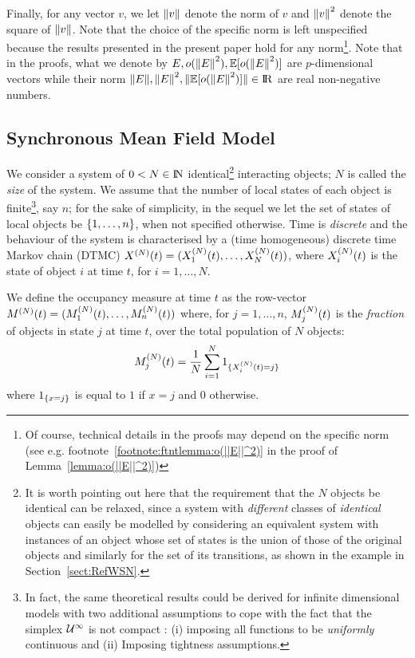 \documentclass[review]{elsarticle}
\begin{document}
Finally, for any vector $v$, we let $\norm{v}$ denote the norm of $v$
and $\norm{v}^2$ denote the square of $\norm{v}$. Note that the choice
of the specific norm is left unspecified because the results presented
in the present paper hold for any norm\footnote{Of course, technical
  details in the proofs may depend on the specific norm (see
  e.g. footnote~\ref{footnote:ftntlemma:o(||E||^2)} in the proof of
  Lemma~\ref{lemma:o(||E||^2)})}.  Note that in the proofs, what we
denote by $E, o(\norm{E}^2), \esp{o(\norm{E}^2)}$ are $p$-dimensional
vectors while their norm
$\norm{E}, \norm{E}^2, \norm{\esp{o(\norm{E}^2)}} \in \reals$ are real
non-negative numbers.

\subsection{Synchronous Mean Field Model}


We consider a system of $0<N \in \mathrm{I\!N}$ identical\footnote{It is worth
  pointing out here that the requirement that the $N$ 
  objects be identical 
  can be relaxed, since a system with {\em different} classes of {\em
    identical} objects can easily be modelled by considering an
  equivalent system with instances of an object whose set of states is
  the union of those of the original objects and similarly for the set
  of its transitions, as shown in the example in
  Section~\ref{sect:RefWSN}.} interacting objects; $N$ is called the
{\em size} of the system.  We assume that the number of local states
of each object is finite\footnote{In fact, the same theoretical
  results could be derived for infinite dimensional models with two
  additional assumptions to cope with the fact that the simplex
  ${\cal U}^{\infty}$ is not compact : (i) imposing all functions to be
  \emph{uniformly} continuous and (ii) Imposing tightness
  assumptions.}, say $n$; for the sake of simplicity, in the sequel we
let the set of states of local objects be $\{1,\ldots, n\}$, when
not specified otherwise.  Time is {\em discrete} and the behaviour of
the system is characterised by a (time homogeneous) discrete time
Markov chain (DTMC) $X^{(N)}(t)=(X_1^{(N)}(t), \ldots, X_N^{(N)}(t))$,
where $X_i^{(N)}(t)$ is the state of object $i$ at time $t$, for
$i=1,\ldots, N$.

We define the occupancy measure at time $t$ as the row-vector
$M^{(N)}(t)=(M_1^{(N)}(t), \ldots, M_n^{(N)}(t))$ where, for
$j=1,\ldots, n$, $M_j^{(N)}(t)$ is the {\em fraction} of objects in state
$j$ at time $t$, over the total population of $N$ objects:
\begin{align*}
  M_j^{(N)}(t) = \frac{1}{N}\sum_{i=1}^N 1_{\{X_i^{(N)}(t)=j\}}
\end{align*}
where $1_{\{x=j\}}$ is equal to $1$ if $x=j$ and $0$ otherwise.
\end{document}
